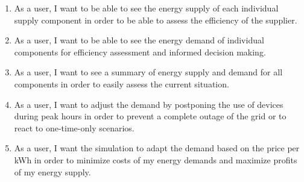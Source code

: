 \begin{enumerate}
\item As a user, I want to be able to see the energy supply of each individual supply component in order to be able to assess the efficiency of the supplier.

\item As a user, I want to be able to see the energy demand of individual components for efficiency assessment and informed decision making. 

\item As a user, I want to see a summary of energy supply and demand for all components in order to easily assess the current situation.

\item As a user, I want to adjust the demand by postponing the use of devices during peak hours in order to prevent a complete outage of the grid or to react to one-time-only scenarios.

\item As a user, I want the simulation to adapt the demand based on the price per kWh in order to minimize costs of my energy demands and maximize profits of my energy supply.

\end{enumerate}

